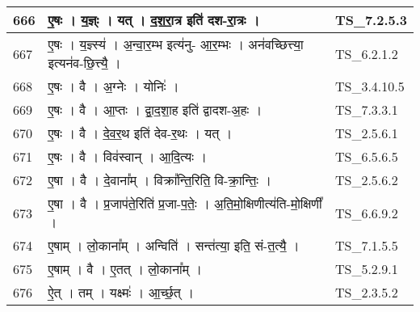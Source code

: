 \documentclass[17pt]{extarticle}
\begin{document}
\begin{longtable}{||p{0.4in}||p{4.9in}||p{0.9in}||}
    \hline
        
    666 & ए॒षः   ।   य॒ज्ञ्ः   ।   यत्   ।   द॒श॒रा॒त्र इति॑ दश{-}रा॒त्रः   ।    & TS\_7.2.5.3       \\
    
    \hline
        
    667 & ए॒षः   ।   य॒ज्ञ्स्य॑   ।   अ॒न्वा॒र॒म्भ इत्य॑नु{-} आ॒र॒म्भः   ।   अन॑वच्छित्त्या॒ इत्यन॑व{-}छि॒त्त्यै॒   ।    & TS\_6.2.1.2       \\
    
    \hline
        
    668 & ए॒षः   ।   वै   ।   अ॒ग्नेः   ।   योनिः॑   ।    & TS\_3.4.10.5       \\
    
    \hline
        
    669 & ए॒षः   ।   वै   ।   आ॒प्तः   ।   द्वा॒द॒शा॒ह इति॑ द्वादश{-}अ॒हः   ।    & TS\_7.3.3.1       \\
    
    \hline
        
    670 & ए॒षः   ।   वै   ।   दे॒व॒र॒थ इति॑ देव{-}र॒थः   ।   यत्   ।    & TS\_2.5.6.1       \\
    
    \hline
        
    671 & ए॒षः   ।   वै   ।   विव॑स्वान्   ।   आ॒दि॒त्यः   ।    & TS\_6.5.6.5       \\
    
    \hline
        
    672 & ए॒षा   ।   वै   ।   दे॒वाना᳚म्   ।   विक्रा᳚न्ति॒रिति॒ वि{-}क्रा॒न्तिः॒   ।    & TS\_2.5.6.2       \\
    
    \hline
        
    673 & ए॒षा   ।   वै   ।   प्र॒जाप॑ते॒रिति॑ प्र॒जा{-}प॒तेः॒   ।   अ॒ति॒मो॒क्षिणीत्य॑ति{-}मो॒क्षिणी᳚   ।    & TS\_6.6.9.2       \\
    
    \hline
        
    674 & ए॒षाम्   ।   लो॒काना᳚म्   ।   अन्विति॑   ।   सन्त॑त्या॒ इति॒ सं{-}त॒त्यै॒   ।    & TS\_7.1.5.5       \\
    
    \hline
        
    675 & ए॒षाम्   ।   वै   ।   ए॒तत्   ।   लो॒काना᳚म्   ।    & TS\_5.2.9.1       \\
    
    \hline
        
    676 & ऐ॒त्   ।   तम्   ।   यक्ष्मः॑   ।   आ॒र्च्छ॒त्   ।    & TS\_2.3.5.2       \\
    

\end{longtable}
\end{document}
